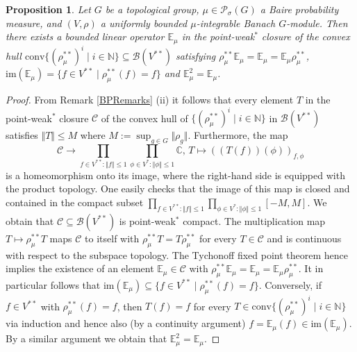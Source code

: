 \documentclass[a4paper,11pt,reqno]{amsart}
\numberwithin{equation}{section}
\newtheorem{proposition}[theorem]{Proposition}
\theoremstyle{definition}
\theoremstyle{remark}
\theoremstyle{remark}
\begin{document}
\begin{proposition} \label{Existence} Let $G$ be a topological group, $\mu\in\mathcal{P}_{\sigma}(G)$ a Baire probability measure, and $(V,\rho)$ a uniformly bounded $\mu$-integrable Banach $G$-module. Then there exists a bounded linear operator $\mathbb{E}_{\mu}$ in the point-weak$^{\ast}$ closure of the convex hull \emph{$\text{conv}\{(\rho_{\mu}^{\ast\ast})^{i}\mid i\in\mathbb{N}\}\subseteq\mathcal{B}(V^{\ast\ast})$} satisfying $\rho_{\mu}^{\ast\ast}\mathbb{E}_{\mu}=\mathbb{E}_{\mu}=\mathbb{E}_{\mu}\rho_{\mu}^{\ast\ast}$, \emph{$\text{im}(\mathbb{E}_{\mu})=\{f\in V^{\ast\ast}\mid\rho_{\mu}^{\ast\ast}(f)=f\}$} and $\mathbb{E}_{\mu}^{2}=\mathbb{E}_{\mu}$. \end{proposition}

\begin{proof} From Remark \ref{BPRemarks} (ii) it follows that every element $T$ in the point-weak$^{\ast}$ closure $\mathcal{C}$ of the convex hull of $\{(\rho_{\mu}^{\ast\ast})^{i}\mid i\in\mathbb{N}\}$ in $\mathcal{B}(V^{\ast\ast})$ satisfies $\Vert T\Vert\leq M$ where $M:=\sup_{g\in G}\Vert\rho_{g}\Vert$. Furthermore, the map 
\[
\mathcal{C}\rightarrow\prod_{f\in V^{\ast\ast}:\Vert f\Vert\leq1}\prod_{\phi\in V^{\ast}:\Vert\phi\Vert\leq1}\mathbb{C}, \, T\mapsto\left(\left(T(f)\right)(\phi)\right)_{f,\phi}
\]
is a homeomorphism onto its image, where the right-hand side is equipped with the product topology. One easily checks that the image of this map is closed and contained in the compact subset $\prod_{f\in V^{\ast\ast}:\Vert f\Vert\leq1}\prod_{\phi\in V^{\ast}:\Vert\phi\Vert\leq1}[-M,M]$. We obtain that $\mathcal{C}\subseteq\mathcal{B}(V^{\ast\ast})$ is point-weak$^{\ast}$ compact. The multiplication map $T\mapsto\rho_{\mu}^{\ast\ast}T$ maps $\mathcal{C}$ to itself with $\rho_{\mu}^{\ast\ast}T=T\rho_{\mu}^{\ast\ast}$ for every $T\in\mathcal{C}$ and is continuous with respect to the subspace topology. The Tychonoff fixed point theorem hence implies the existence of an element $\mathbb{E}_{\mu}\in\mathcal{C}$ with $\rho_{\mu}^{\ast\ast}\mathbb{E}_{\mu}=\mathbb{E}_{\mu}=\mathbb{E}_{\mu}\rho_{\mu}^{\ast\ast}$. It in particular follows that $\text{im}(\mathbb{E}_{\mu})\subseteq\{f\in V^{\ast\ast}\mid\rho_{\mu}^{\ast\ast}(f)=f\}$. Conversely, if $f\in V^{\ast\ast}$ with $\rho_{\mu}^{\ast\ast}(f)=f$, then $T(f)=f$ for every $T\in\text{conv}\{(\rho_{\mu}^{\ast\ast})^{i}\mid i\in\mathbb{N}\}$ via induction and hence also (by a continuity argument) $f=\mathbb{E}_{\mu}(f)\in\text{im}(\mathbb{E}_{\mu})$. By a similar argument we obtain that $\mathbb{E}_{\mu}^{2}=\mathbb{E}_{\mu}$. \end{proof}
\end{document}
